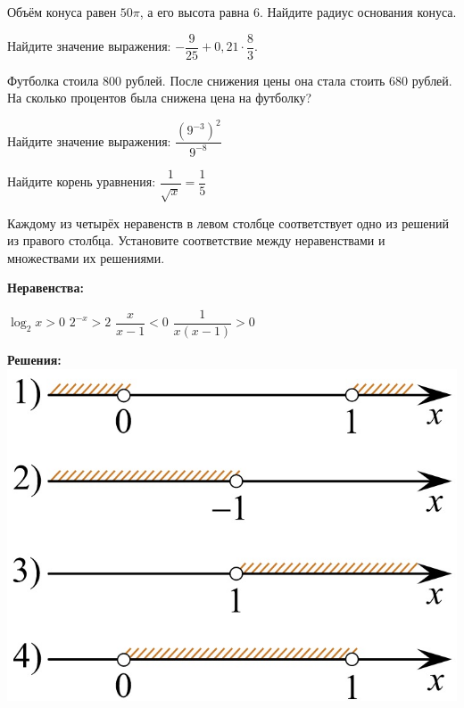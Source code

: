 \begin{class}[number=6]
\begin{listofex}
		\item Объём конуса равен \(50\pi \), а его высота равна \(6\). Найдите радиус основания конуса.
		\item Найдите значение выражения: \(-\dfrac{ 9 }{ 25 }+0,21 \cdot \dfrac{ 8 }{ 3 }\).
		\item Футболка стоила \(800\) рублей. После снижения цены она стала стоить \(680\) рублей. На сколько процентов была снижена цена на футболку?
		\item Найдите значение выражения: \( \dfrac{ (9^{-3})^2 }{ 9^{-8} } \)
		\item Найдите корень уравнения: \(\dfrac{ 1 }{ \sqrt{x} }=\dfrac{ 1 }{ 5 }\)
		\newpage
		\item Каждому из четырёх неравенств в левом столбце соответствует одно из решений из правого столбца. Установите соответствие между неравенствами и множествами их решениями. \\
		\begin{minipage}[t]{0.55\linewidth}
			\textbf{Неравенства:}
			\begin{tasks}
				\task \( \log_2 x >0 \)
				\task \( 2^{-x} > 2 \)
				\task \( \dfrac{ x }{ x-1 }<0 \)
				\task \( \dfrac{ 1 }{ x(x-1) }>0 \)
			\end{tasks}
		\end{minipage}
		\hspace{0.02\linewidth}
		\begin{minipage}[t]{0.4\linewidth}
			\textbf{Решения:}
			\includegraphics[align=t, width=\linewidth]{../pics/G101M8L6-7}
		\end{minipage}

\end{listofex}
\end{class}

